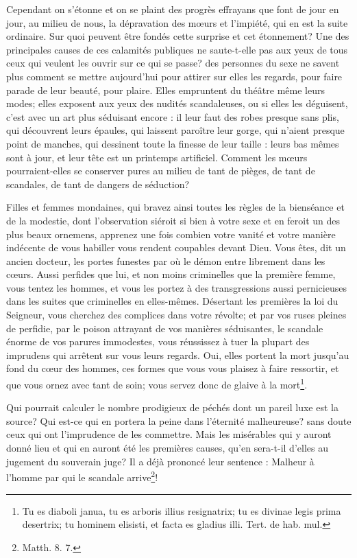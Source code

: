 \documentclass[instructions.tex]{subfiles}
\begin{document}
\secundo Cependant on s'étonne et on se plaint des progrès effrayans que font de jour en jour, au milieu de nous, la dépravation des mœurs et l'impiété, qui en est la suite ordinaire. Sur quoi peuvent être fondés cette surprise et cet étonnement? Une des principales causes de ces calamités publiques ne saute-t-elle pas aux yeux de tous ceux qui veulent les ouvrir sur ce qui se passe? des personnes du sexe ne savent plus comment se mettre aujourd'hui pour attirer sur elles les regards, pour faire parade de leur beauté, pour plaire. Elles empruntent du théâtre même leurs modes; elles exposent aux yeux des nudités scandaleuses, ou si elles les déguisent, c'est avec un art plus séduisant encore : il leur faut des robes presque sans plis, qui découvrent leurs épaules, qui laissent paroître leur gorge, qui n'aient presque point de manches, qui dessinent toute la finesse de leur taille : leurs bas mêmes sont à jour, et leur tête est un printemps artificiel. Comment les mœurs pourraient-elles se conserver pures au milieu de tant de pièges, de tant de scandales, de tant de dangers de séduction?
 
Filles et femmes mondaines, qui bravez ainsi toutes les règles de la bienséance et de la modestie, dont l'observation siéroit si bien à votre sexe et en feroit un des plus beaux ornemens, apprenez une fois combien votre vanité et votre manière indécente de vous habiller vous rendent coupables devant Dieu. Vous êtes, dit un ancien docteur, les portes funestes par où le démon entre librement dans les cœurs. Aussi perfides que lui, et non moins criminelles que la première femme, vous tentez les hommes, et vous les portez à des transgressions aussi pernicieuses dans les suites que criminelles en elles-mêmes. Désertant les premières la loi du Seigneur, vous cherchez des complices dans votre révolte; et par vos ruses pleines de perfidie, par le poison attrayant de vos manières séduisantes, le scandale énorme de vos parures immodestes, vous réussissez à tuer la plupart des imprudens qui arrêtent sur vous leurs regards. Oui, elles portent la mort jusqu'au fond du cœur des hommes, ces formes que vous vous plaisez à faire ressortir, et que vous ornez avec tant de soin; vous servez donc de glaive à la mort\footnote{Tu es diaboli janua, tu es arboris illius resignatrix; tu es divinae legis prima desertrix; tu hominem elisisti, et facta es gladius illi. Tert. de hab. mul.}.
 
Qui pourrait calculer le nombre prodigieux de péchés dont un pareil luxe est la source? Qui est-ce qui en portera la peine dans l'éternité malheureuse? sans doute ceux qui ont l'imprudence de les commettre. Mais les misérables qui y auront donné lieu et qui en auront été les premières causes, qu'en sera-t-il d'elles au jugement du souverain juge? Il a déjà prononcé leur sentence : Malheur à l'homme par qui le scandale arrive\footnote{Matth. 8. 7.}!
 
\end{document}
